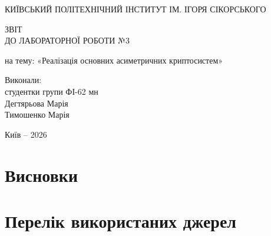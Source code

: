 \documentclass[12pt,a4paper]{article}
\begin{document}
\begin{titlepage}

\begin{center}

КИЇВСЬКИЙ ПОЛІТЕХНІЧНИЙ ІНСТИТУТ
ІМ. ІГОРЯ СІКОРСЬКОГО

\vspace{2cm}

{\large ЗВІТ}\\
{\large ДО ЛАБОРАТОРНОЇ РОБОТИ №3}

\vspace{1cm}

{\large на тему: «Реалізація основних асиметричних криптосистем»}

\vspace{0.5cm}

\textbf{}

\end{center}

\vfill

\begin{flushright}
\begin{minipage}{0.4\textwidth}

Виконали:\\
студентки групи ФІ-62 мн\\
Дегтярьова Марія\\
Тимошенко Марія

\end{minipage}
\end{flushright}

\vfill

\begin{center}
Київ -- 2026
\end{center}

\end{titlepage}

\tableofcontents
\newpage










\section*{Висновки}



\section*{Перелік використаних джерел}
\end{document}
